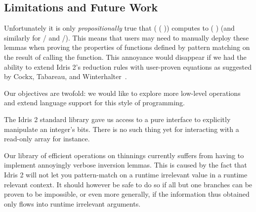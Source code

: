 \documentclass{article}
\newcommand{\idris}{Idris 2}
\begin{document}

\subsection{Limitations and Future Work}

Unfortunately it is only \emph{propositionally} true that
( (  ))
computes to (  ) (and similarly for
/ and /).
%
This means that users may need to manually deploy these lemmas when proving the
properties of functions defined by pattern matching on the result of calling the
 function.
%
This annoyance would disappear if we had the ability to extend \idris{}'s reduction rules
with user-proven equations as suggested by Cockx, Tabareau, and
Winterhalter~\cite{DBLP:journals/pacmpl/CockxTW21}.

Our objectives are twofold: we would like to explore more low-level operations and
extend language support for this style of programming.

The \idris{} standard library gave us access to a pure interface to explicitly
manipulate an integer's bits. There is no such thing yet for interacting with a
read-only array for instance.



Our library of efficient operations on thinnings currently suffers from having to
implement annoyingly verbose inversion lemmas. This is caused by the fact that
\idris{} will not let you pattern-match on a runtime irrelevant value in a runtime
relevant context. It should however be safe to do so if all but one branches can
be proven to be impossible, or even more generally, if the information thus obtained
only flows into runtime irrelevant arguments.



\end{document}
